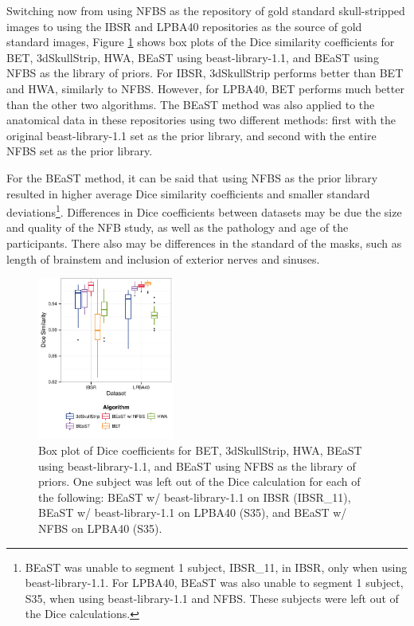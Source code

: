 Switching now from using NFBS as the repository of gold standard skull-stripped images to using the IBSR and LPBA40 repositories as the source of gold standard images, Figure \ref{fig:boxplot_I&L} shows box plots of the Dice similarity coefficients for BET, 3dSkullStrip, HWA, BEaST using beast-library-1.1, and BEaST using NFBS as the library of priors. For IBSR, 3dSkullStrip performs better than BET and HWA, similarly to NFBS. However, for LPBA40, BET performs much better than the other two algorithms. The BEaST method was also applied to the anatomical data in these repositories using two different methods: first with the original beast-library-1.1 set as the prior library, and second with the entire NFBS set as the prior library.


For the BEaST method, it can be said that using NFBS as the prior library resulted in higher average Dice similarity coefficients and smaller standard deviations\footnote{BEaST was unable to segment 1 subject, IBSR\_11, in IBSR, only when using beast-library-1.1. For LPBA40, BEaST was also unable to segment 1 subject, S35, when using beast-library-1.1 and NFBS. These subjects were left out of the Dice calculations.}. Differences in Dice coefficients between datasets may be due the size and quality of the NFB study, as well as the pathology and age of the participants. There also may be differences in the standard of the masks, such as length of brainstem and inclusion of exterior nerves and sinuses.

\begin{figure}[ht!]
\includegraphics[width=0.4\textwidth]{boxplot_IL.pdf}
    \caption{
Box plot of Dice coefficients for BET, 3dSkullStrip, HWA, BEaST using beast-library-1.1, and BEaST using NFBS as the library of priors. One subject was left out of the Dice calculation for each of the following: BEaST w/ beast-library-1.1 on IBSR (IBSR\_11), BEaST w/ beast-library-1.1 on LPBA40 (S35), and BEaST w/ NFBS on LPBA40 (S35).}
\label{fig:boxplot_I&L}
\end{figure}


